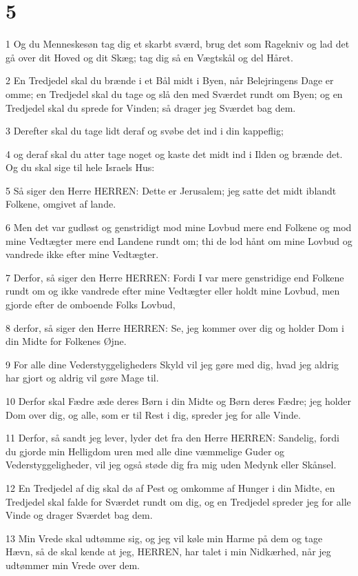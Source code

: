 \chapter{5}

\par 1 Og du Menneskesøn tag dig et skarbt sværd, brug det som Ragekniv og lad det gå over dit Hoved og dit Skæg; tag dig så en Vægtskål og del Håret.
\par 2 En Tredjedel skal du brænde i et Bål midt i Byen, når Belejringens Dage er omme; en Tredjedel skal du tage og slå den med Sværdet rundt om Byen; og en Tredjedel skal du sprede for Vinden; så drager jeg Sværdet bag dem.
\par 3 Derefter skal du tage lidt deraf og svøbe det ind i din kappeflig;
\par 4 og deraf skal du atter tage noget og kaste det midt ind i Ilden og brænde det. Og du skal sige til hele Israels Hus:
\par 5 Så siger den Herre HERREN: Dette er Jerusalem; jeg satte det midt iblandt Folkene, omgivet af lande.
\par 6 Men det var gudløst og genstridigt mod mine Lovbud mere end Folkene og mod mine Vedtægter mere end Landene rundt om; thi de lod hånt om mine Lovbud og vandrede ikke efter mine Vedtægter.
\par 7 Derfor, så siger den Herre HERREN: Fordi I var mere genstridige end Folkene rundt om og ikke vandrede efter mine Vedtægter eller holdt mine Lovbud, men gjorde efter de omboende Folks Lovbud,
\par 8 derfor, så siger den Herre HERREN: Se, jeg kommer over dig og holder Dom i din Midte for Folkenes Øjne.
\par 9 For alle dine Vederstyggeligheders Skyld vil jeg gøre med dig, hvad jeg aldrig har gjort og aldrig vil gøre Mage til.
\par 10 Derfor skal Fædre æde deres Børn i din Midte og Børn deres Fædre; jeg holder Dom over dig, og alle, som er til Rest i dig, spreder jeg for alle Vinde.
\par 11 Derfor, så sandt jeg lever, lyder det fra den Herre HERREN: Sandelig, fordi du gjorde min Helligdom uren med alle dine væmmelige Guder og Vederstyggeligheder, vil jeg også støde dig fra mig uden Medynk eller Skånsel.
\par 12 En Tredjedel af dig skal dø af Pest og omkomme af Hunger i din Midte, en Tredjedel skal falde for Sværdet rundt om dig, og en Tredjedel spreder jeg for alle Vinde og drager Sværdet bag dem.
\par 13 Min Vrede skal udtømme sig, og jeg vil køle min Harme på dem og tage Hævn, så de skal kende at jeg, HERREN, har talet i min Nidkærhed, når jeg udtømmer min Vrede over dem.
